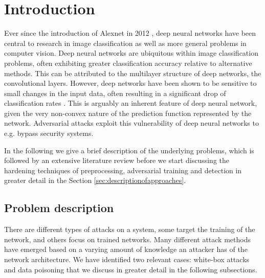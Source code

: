 \section{Introduction}

Ever since the introduction of Alexnet in 2012 \cite{krizhevsky2012imagenet}, deep neural networks have been central to research in image classification as well as more general problems in computer vision. Deep neural networks are ubiquitous within image classification problems, often exhibiting greater classification accuracy relative to alternative methods. This can be attributed to the multilayer structure of deep networks, the convolutional layers. However, deep networks have been shown to be sensitive to small changes in the input data, often resulting in a significant drop of classification rates \cite{Szegedy13}. This is arguably an inherent feature of deep neural network, given the very non-convex nature of the prediction function represented by the network. Adversarial attacks exploit this vulnerability of deep neural networks to e.g. bypass security systems.

In the following we give a brief description of the underlying problems, which is followed by an extensive literature review before we start discussing the hardening techniques of preprocessing, adversarial training and detection in greater detail in the Section \ref{sec:descriptionofapproaches}.

\subsection{Problem description}

There are different types of attacks on a system, some target the training of the network, and others focus on trained networks. Many different attack methods have emerged based on a varying amount of knowledge an attacker has of the network architecture. We have identified two relevant cases: white-box attacks and data poisoning that we discuss in greater detail in the following subsections. 

